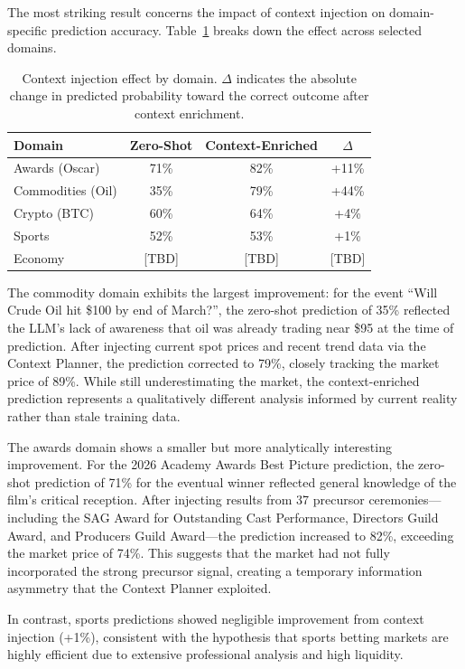 The most striking result concerns the impact of context injection on domain-specific prediction accuracy. Table~\ref{tab:context_effect} breaks down the effect across selected domains.

\begin{table}[t]
\centering
\caption{Context injection effect by domain. $\Delta$ indicates the absolute change in predicted probability toward the correct outcome after context enrichment.}
\label{tab:context_effect}
\small
\begin{tabular}{@{}lccc@{}}
\toprule
Domain & Zero-Shot & Context-Enriched & $\Delta$ \\ \midrule
Awards (Oscar) & 71\% & 82\% & +11\% \\
Commodities (Oil) & 35\% & 79\% & +44\% \\
Crypto (BTC) & 60\% & 64\% & +4\% \\
Sports & 52\% & 53\% & +1\% \\
Economy & [TBD] & [TBD] & [TBD] \\
\bottomrule
\end{tabular}
\end{table}

The commodity domain exhibits the largest improvement: for the event ``Will Crude Oil hit \$100 by end of March?'', the zero-shot prediction of 35\% reflected the LLM's lack of awareness that oil was already trading near \$95 at the time of prediction. After injecting current spot prices and recent trend data via the Context Planner, the prediction corrected to 79\%, closely tracking the market price of 89\%. While still underestimating the market, the context-enriched prediction represents a qualitatively different analysis informed by current reality rather than stale training data.

The awards domain shows a smaller but more analytically interesting improvement. For the 2026 Academy Awards Best Picture prediction, the zero-shot prediction of 71\% for the eventual winner reflected general knowledge of the film's critical reception. After injecting results from 37 precursor ceremonies---including the SAG Award for Outstanding Cast Performance, Directors Guild Award, and Producers Guild Award---the prediction increased to 82\%, exceeding the market price of 74\%. This suggests that the market had not fully incorporated the strong precursor signal, creating a temporary information asymmetry that the Context Planner exploited.

In contrast, sports predictions showed negligible improvement from context injection (+1\%), consistent with the hypothesis that sports betting markets are highly efficient due to extensive professional analysis and high liquidity.

